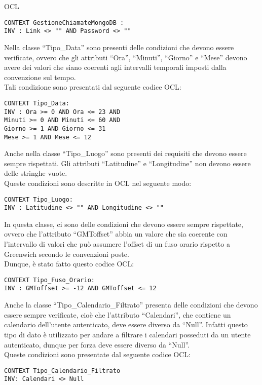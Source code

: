 \begin{listaPersonale}{OCL}
    \begin{lstlisting}
CONTEXT GestioneChiamateMongoDB :
INV : Link <> "" AND Password <> "" 
    \end{lstlisting}




    Nella classe “Tipo\_Data” sono presenti delle condizioni che devono essere verificate, ovvero che gli attributi “Ora”, “Minuti”, “Giorno” e “Mese” devono avere dei valori che siano coerenti agli intervalli temporali imposti dalla convenzione sul tempo.\\
    Tali condizione sono presentati dal seguente codice OCL:

    \begin{lstlisting}
CONTEXT Tipo_Data:
INV : Ora >= 0 AND Ora <= 23 AND
Minuti >= 0 AND Minuti <= 60 AND
Giorno >= 1 AND Giorno <= 31
Mese >= 1 AND Mese <= 12
    \end{lstlisting}




    Anche nella classe “Tipo\_Luogo” sono presenti dei requisiti che devono essere sempre rispettati. Gli attributi “Latitudine” e “Longitudine” non devono essere delle stringhe vuote.\\
    Queste condizioni sono descritte in OCL nel seguente modo:

    \begin{lstlisting}
CONTEXT Tipo_Luogo:
INV : Latitudine <> "" AND Longitudine <> "" 
    \end{lstlisting}




    In questa classe, ci sono delle condizioni che devono essere sempre rispettate, ovvero che l’attributo “GMToffset” abbia un valore che sia coerente con l’intervallo di valori che può assumere l’offset di un fuso orario rispetto a Greenwich secondo le convenzioni poste.\\
    Dunque, è stato fatto questo codice OCL:

    \begin{lstlisting}
CONTEXT Tipo_Fuso_Orario:
INV : GMToffset >= -12 AND GMToffset <= 12 
    \end{lstlisting}




    Anche la classe “Tipo\_Calendario\_Filtrato” presenta delle condizioni che devono essere sempre verificate, cioè che l’attributo “Calendari”, che contiene un calendario dell’utente autenticato, deve essere diverso da “Null”. Infatti questo tipo di dato è utilizzato per andare a filtrare i calendari posseduti da un utente autenticato, dunque per forza deve essere diverso da “Null”. \\
    Queste condizioni sono presentate dal seguente codice OCL:
    \begin{lstlisting}
CONTEXT Tipo_Calendario_Filtrato
INV: Calendari <> Null
    \end{lstlisting}





\end{listaPersonale}
